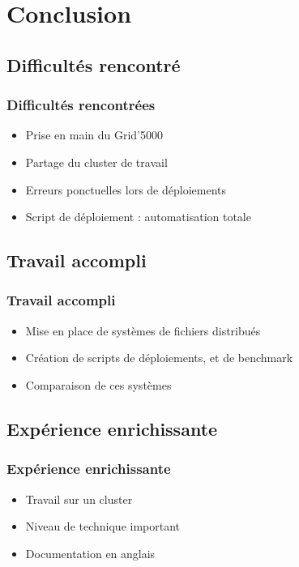 \documentclass[blue]{beamer}
\begin{document}
\section{Conclusion}
	\subsection{Difficultés rencontré}
	\begin{frame}
	\frametitle{Difficultés rencontrées}
		\begin{itemize}
			\item Prise en main du Grid'5000
			\item Partage du cluster de travail
			\item Erreurs ponctuelles lors de déploiements
			\item Script de déploiement : automatisation totale
		\end{itemize}
	\end{frame}

	\subsection{Travail accompli}
	\begin{frame}
	\frametitle{Travail accompli}
		\begin{itemize}
			\item Mise en place de systèmes de fichiers distribués
			\item Création de scripts de déploiements, et de benchmark
			\item Comparaison de ces systèmes
		\end{itemize}
	\end{frame}

	\subsection{Expérience enrichissante}
	\begin{frame}
	\frametitle{Expérience enrichissante}
		\begin{itemize}
			\item Travail sur un cluster
			\item Niveau de technique important
			\item Documentation en anglais
		\end{itemize}
	\end{frame}
\end{document}
